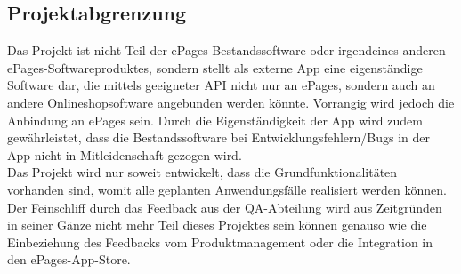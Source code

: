 \subsection{Projektabgrenzung} 
\label{sec:Projektabgrenzung}

Das Projekt ist nicht Teil der ePages-Bestandssoftware oder irgendeines anderen ePages-Softwareproduktes, sondern stellt als externe App eine eigenständige Software dar, die mittels geeigneter API nicht nur an ePages, sondern auch an andere Onlineshopsoftware angebunden werden könnte. Vorrangig wird jedoch die Anbindung an ePages sein. Durch die Eigenständigkeit der App wird zudem gewährleistet, dass die Bestandssoftware bei Entwicklungsfehlern/Bugs in der App nicht in Mitleidenschaft gezogen wird. \\
Das Projekt wird nur soweit entwickelt, dass die Grundfunktionalitäten vorhanden sind, womit alle geplanten Anwendungsfälle realisiert werden können. Der Feinschliff durch das Feedback aus der QA-Abteilung wird aus Zeitgründen in seiner Gänze nicht mehr Teil dieses Projektes sein können genauso wie die Einbeziehung des Feedbacks vom Produktmanagement oder die Integration in den ePages-App-Store.


